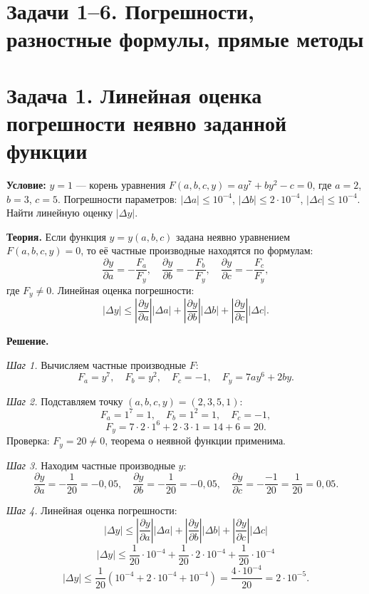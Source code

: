 \documentclass{article}
\begin{document}
\section*{Задачи 1--6. Погрешности, разностные формулы, прямые методы}

\section*{Задача 1. Линейная оценка погрешности неявно заданной функции}

\textbf{Условие:} $y = 1$ --- корень уравнения $F(a,b,c,y) = ay^7 + by^2 - c = 0$, где $a = 2$, $b = 3$, $c = 5$. Погрешности параметров: $|\Delta a| \le 10^{-4}$, $|\Delta b| \le 2\cdot 10^{-4}$, $|\Delta c| \le 10^{-4}$. Найти линейную оценку $|\Delta y|$.

\textbf{Теория.} Если функция $y = y(a,b,c)$ задана неявно уравнением $F(a,b,c,y) = 0$, то её частные производные находятся по формулам:
$$
\frac{\partial y}{\partial a} = -\frac{F_a}{F_y}, \quad
\frac{\partial y}{\partial b} = -\frac{F_b}{F_y}, \quad
\frac{\partial y}{\partial c} = -\frac{F_c}{F_y},
$$
где $F_y \neq 0$. Линейная оценка погрешности:
$$
|\Delta y| \le \left|\frac{\partial y}{\partial a}\right||\Delta a| + \left|\frac{\partial y}{\partial b}\right||\Delta b| + \left|\frac{\partial y}{\partial c}\right||\Delta c|.
$$

\textbf{Решение.}

\textit{Шаг 1.} Вычисляем частные производные $F$:
$$
F_a = y^7, \quad F_b = y^2, \quad F_c = -1, \quad F_y = 7ay^6 + 2by.
$$

\textit{Шаг 2.} Подставляем точку $(a,b,c,y) = (2, 3, 5, 1)$:
$$
F_a = 1^7 = 1, \quad F_b = 1^2 = 1, \quad F_c = -1,
$$
$$
F_y = 7\cdot 2\cdot 1^6 + 2\cdot 3\cdot 1 = 14 + 6 = 20.
$$
Проверка: $F_y = 20 \neq 0$, теорема о неявной функции применима.

\textit{Шаг 3.} Находим частные производные $y$:
$$
\frac{\partial y}{\partial a} = -\frac{1}{20} = -0{,}05, \quad
\frac{\partial y}{\partial b} = -\frac{1}{20} = -0{,}05, \quad
\frac{\partial y}{\partial c} = -\frac{-1}{20} = \frac{1}{20} = 0{,}05.
$$

\textit{Шаг 4.} Линейная оценка погрешности:
$$
|\Delta y| \le \left|\frac{\partial y}{\partial a}\right||\Delta a| + \left|\frac{\partial y}{\partial b}\right||\Delta b| + \left|\frac{\partial y}{\partial c}\right||\Delta c|
$$
$$
|\Delta y| \le \frac{1}{20}\cdot 10^{-4} + \frac{1}{20}\cdot 2\cdot 10^{-4} + \frac{1}{20}\cdot 10^{-4}
$$
$$
|\Delta y| \le \frac{1}{20}\left(10^{-4} + 2\cdot 10^{-4} + 10^{-4}\right) = \frac{4\cdot 10^{-4}}{20} = 2\cdot 10^{-5}.
$$
\end{document}

